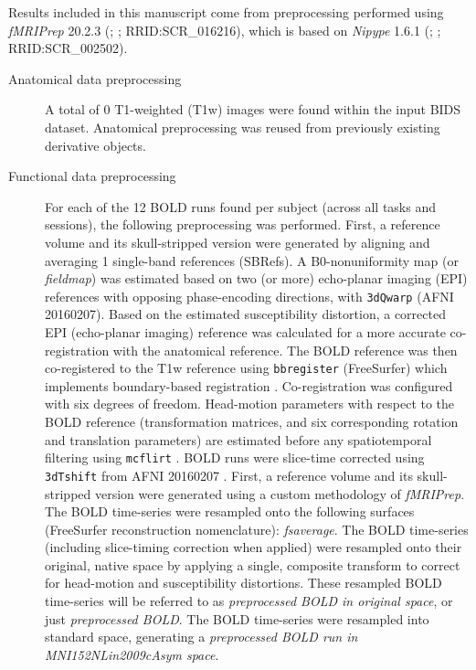 \documentclass[]{article}
\date{}
\begin{document}
Results included in this manuscript come from preprocessing performed
using \emph{fMRIPrep} 20.2.3 (\citet{fmriprep1}; \citet{fmriprep2};
RRID:SCR\_016216), which is based on \emph{Nipype} 1.6.1
(\citet{nipype1}; \citet{nipype2}; RRID:SCR\_002502).

\begin{description}
\item[Anatomical data preprocessing]
A total of 0 T1-weighted (T1w) images were found within the input BIDS
dataset. Anatomical preprocessing was reused from previously existing
derivative objects.
\item[Functional data preprocessing]
For each of the 12 BOLD runs found per subject (across all tasks and
sessions), the following preprocessing was performed. First, a reference
volume and its skull-stripped version were generated by aligning and
averaging 1 single-band references (SBRefs). A B0-nonuniformity map (or
\emph{fieldmap}) was estimated based on two (or more) echo-planar
imaging (EPI) references with opposing phase-encoding directions, with
\texttt{3dQwarp} \citet{afni} (AFNI 20160207). Based on the estimated
susceptibility distortion, a corrected EPI (echo-planar imaging)
reference was calculated for a more accurate co-registration with the
anatomical reference. The BOLD reference was then co-registered to the
T1w reference using \texttt{bbregister} (FreeSurfer) which implements
boundary-based registration \citep{bbr}. Co-registration was configured
with six degrees of freedom. Head-motion parameters with respect to the
BOLD reference (transformation matrices, and six corresponding rotation
and translation parameters) are estimated before any spatiotemporal
filtering using \texttt{mcflirt} \citep[FSL 5.0.9,][]{mcflirt}. BOLD
runs were slice-time corrected using \texttt{3dTshift} from AFNI
20160207 \citep[RRID:SCR\_005927]{afni}. First, a reference volume and
its skull-stripped version were generated using a custom methodology of
\emph{fMRIPrep}. The BOLD time-series were resampled onto the following
surfaces (FreeSurfer reconstruction nomenclature): \emph{fsaverage}. The
BOLD time-series (including slice-timing correction when applied) were
resampled onto their original, native space by applying a single,
composite transform to correct for head-motion and susceptibility
distortions. These resampled BOLD time-series will be referred to as
\emph{preprocessed BOLD in original space}, or just \emph{preprocessed
BOLD}. The BOLD time-series were resampled into standard space,
generating a \emph{preprocessed BOLD run in MNI152NLin2009cAsym space}.

\end{description}
\end{document}
